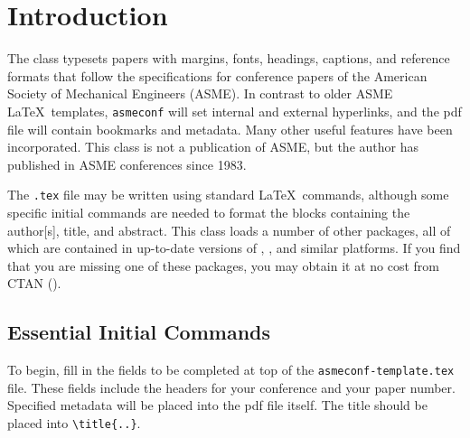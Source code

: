 \documentclass[grid,balance,upint,subscriptcorrection,varvw,mathalfa=cal=euler,spanish,french,greek,russian,vietnamese,colorlinks]{asmeconf}
\begin{document}
\begin{nomenclature}



\end{nomenclature}



\section{Introduction}

The \texttt{} class typesets papers with margins, fonts, headings, captions, and reference formats that follow the specifications for conference papers of the American Society of Mechanical Engineers (ASME). In contrast to older ASME \LaTeX\ templates, \texttt{asmeconf} will set internal and external hyperlinks, and the pdf file will contain bookmarks and metadata. Many other useful features have been incorporated. This class is not a publication of ASME, but the author has published in ASME conferences since 1983. 

The \texttt{.tex} file may be written using standard \LaTeX\ commands, although some specific initial commands are needed to format the blocks containing the author[s], title, and abstract.  This class loads a number of other packages, all of which are contained in up-to-date versions of , , and similar platforms. If you find that you are missing one of these packages, you may obtain it at no cost from CTAN (). 

\subsection{Essential Initial Commands}

To begin, fill in the fields to be completed at top of the \texttt{asmeconf-template.tex} file. These fields include the headers for your conference and your paper number. Specified metadata will be placed into the pdf file itself. 
The title should be placed into \verb|\title{..}|. 
\end{document}
